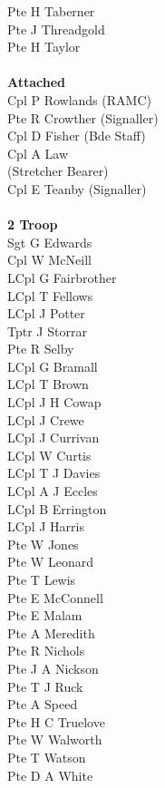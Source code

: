 \begin{multicols}{3}
  Pte H Taberner \\
  Pte J Threadgold \\
  Pte H Taylor \\
  \\
  \textbf{Attached} \\
  Cpl P Rowlands (RAMC) \\
  Pte R Crowther (Signaller) \\
  Cpl D Fisher (Bde Staff) \\
  Cpl A Law \\ \indent (Stretcher Bearer) \\
  Cpl E Teanby (Signaller) \\
  \\
  \textbf{2 Troop} \\
  Sgt G Edwards \\
  Cpl W McNeill \\
  LCpl G Fairbrother \\
  LCpl T Fellows \\
  LCpl J Potter \\
  Tptr J Storrar \\
  Pte R Selby \\
  LCpl G Bramall \\
  LCpl T Brown \\
  LCpl J H Cowap \\
  LCpl J Crewe \\
  LCpl J Currivan \\
  LCpl W Curtis \\
  LCpl T J Davies \\
  LCpl A J Eccles \\
  LCpl B Errington \\
  LCpl J Harris \\
  Pte W Jones \\
  Pte W Leonard \\
  Pte T Lewis \\
  Pte E McConnell \\
  Pte E Malam \\
  Pte A Meredith \\
  Pte R Nichols \\
  Pte J A Nickson \\
  Pte T J Ruck \\
  Pte A Speed \\
  Pte H C Truelove \\
  Pte W Walworth \\
  Pte T Watson \\
  Pte D A White \\

\end{multicols}
